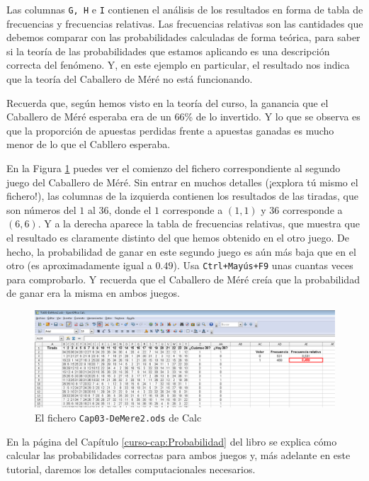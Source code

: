 \documentclass[10pt,a4paper]{article}\usepackage[]{graphicx}\usepackage[]{color}
\newcounter {cont01}
\begin{document}
Las columnas {\tt G, H} e {\tt I} contienen el análisis de los resultados en forma de tabla de frecuencias y frecuencias relativas. Las frecuencias relativas son las cantidades que debemos comparar con las probabilidades calculadas de forma teórica, para saber si la teoría de las probabilidades que estamos aplicando es una descripción correcta del fenómeno. Y, en este ejemplo en particular, el resultado nos indica que la teoría del Caballero de Méré no está funcionando.

Recuerda que, según hemos visto en la teoría del curso, la ganancia que el Caballero de Méré esperaba era de un 66\% de lo invertido. Y lo que se observa es que la proporción de apuestas perdidas frente a apuestas ganadas es mucho menor de lo que el Cabllero esperaba.

En la Figura \ref{tut03:fig:Cap03-DeMere2.ods} puedes ver el comienzo del fichero correspondiente al segundo juego del Caballero de Méré. Sin entrar en muchos detalles (¡explora tú mismo el fichero!), las columnas de la izquierda contienen los resultados de las tiradas, que son números del $1$ al $36$, donde el $1$ corresponde a $(1,1)$ y $36$ corresponde a $(6,6)$. Y a la derecha aparece la tabla de frecuencias relativas, que muestra que el resultado es claramente distinto del que hemos obtenido en el otro juego. De hecho, la probabilidad de ganar en este segundo juego es aún más baja que en el otro (es aproximadamente igual a $0.49$). Usa {\tt Ctrl+Mayús+F9} unas cuantas veces para comprobarlo. Y recuerda que el Caballero de Méré creía que la probabilidad de ganar era la misma en ambos juegos.
\begin{figure}[h!]
\begin{center}
\includegraphics[width=15cm]{./fig/Tut03-42.png}
\end{center}
\caption{El fichero {\tt Cap03-DeMere2.ods} de Calc}
\label{tut03:fig:Cap03-DeMere2.ods}
\end{figure}
En la página \pageref{curso-cap03:subsubsec:JuegosDeMereCombinatoria} del Capítulo \ref{curso-cap:Probabilidad} del libro se explica cómo calcular las probabilidades correctas para ambos juegos y, más adelante en este tutorial, daremos los detalles computacionales necesarios.
\end{document}

